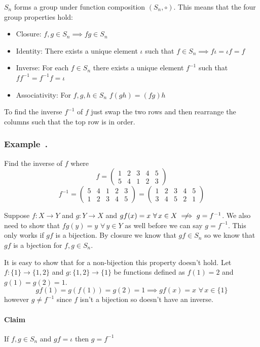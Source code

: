\documentclass{article}
\newcommand{\A}{\,\forall\,}
\newcounter{example}[section]
\newenvironment{example}[1][]{\refstepcounter{example}\vspace{-0.2cm}
\subsubsection*{Example~\thesection.\theexample} \rmfamily}{\par}
\begin{document}
\(S_n\) forms a group under function composition \((S_n,\circ)\). This means that the four group properties hold:
\begin{itemize}
\item Closure: \(f,g\in S_n\implies fg\in S_n\)
\item Identity: There exists a unique element \(\iota\) such that \(f\in S_n\implies f\iota=\iota f=f\)
\item Inverse: For each \(f\in S_n\) there exists a unique element \(f^{-1}\) such that \(ff^{-1}=f^{-1}f=\iota\)
\item Associativity: For \(f,g,h\in S_n\) \(f(gh)=(fg)h\)
\end{itemize}
To find the inverse \(f^{-1}\) of \(f\) just swap the two rows and then rearrange the columns such that the top row is in order.
\begin{example}
Find the inverse of \(f\) where 
\[f=
\begin{pmatrix}
1 & 2 & 3 & 4 & 5\\
5 & 4 & 1 & 2 & 3
\end{pmatrix}
\]
\[f^{-1}=
\begin{pmatrix}
5 & 4 & 1 & 2 & 3\\
1 & 2 & 3 & 4 & 5
\end{pmatrix}
=
\begin{pmatrix}
1 & 2 & 3 & 4 & 5\\
3 & 4 & 5 & 2 & 1
\end{pmatrix}
\]
\end{example}
Suppose \(f:X\to Y\) and \(g:Y\to X\) and \(gf(x)=x\,\A x\in X\centernot\implies g=f^{-1}\). We also need to show that \(fg(y)=y\,\A y\in Y\) as well before we can say \(g=f^{-1}\). This only works if \(gf\) is a bijection. By closure we know that \(gf\in S_n\) so we know that \(gf\) is a bjection for \(f,g\in S_n\).

It is easy to show that for a non-bijection this property doesn't hold. Let \(f:\{1\}\to \{1,2\}\) and \(g:\{1,2\}\to \{1\}\) be functions defined as \(f(1)=2\) and \(g(1)=g(2)=1\).
\[gf(1)=g(f(1))=g(2)=1\implies gf(x)=x\,\A x\in\{1\}\]
however \(g\ne f^{-1}\) since \(f\) isn't a bijection so doesn't have an inverse.

\paragraph{Claim} If \(f,g\in S_n\) and \(gf=\iota\) then \(g=f^{-1}\)
\end{document}
